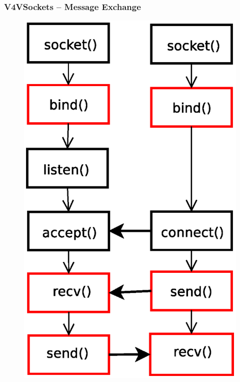 \documentclass[red,slidestop,notes,compress,mathserif]{beamer}
\begin{document}
\begin{frame}
\frametitle{V4VSockets -- Message Exchange}
\begin{figure}
\includegraphics[scale=0.30]{figures/sockets1.eps}
\end{figure}
\end{frame}
\end{document}
